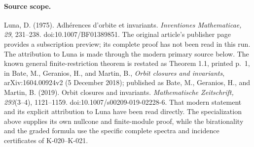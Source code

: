 \paragraph{Source scope.}
Luna, D. (1975). Adh\'erences d'orbite et invariants.
\emph{Inventiones Mathematicae, 29}, 231--238.
doi:10.1007/BF01389851.  The original article's publisher page
provides a subscription preview; its complete proof has not been
read in this run.  The attribution to Luna is made through the
modern primary source below.
The known general finite-restriction theorem is restated as
Theorem 1.1, printed p.~1, in Bate, M., Geranios, H., and Martin, B.,
\emph{Orbit closures and invariants}, arXiv:1604.00924v2
(5 December 2018); published as Bate, M., Geranios, H., and
Martin, B. (2019). Orbit closures and invariants.
\emph{Mathematische Zeitschrift, 293}(3--4), 1121--1159.
doi:10.1007/s00209-019-02228-6.
That modern statement and its explicit attribution to Luna have
been read directly.  The specialization above supplies its own
nullcone and finite-module proof, while the birationality and the
graded formula use the specific complete spectra and incidence
certificates of K-020--K-021.
